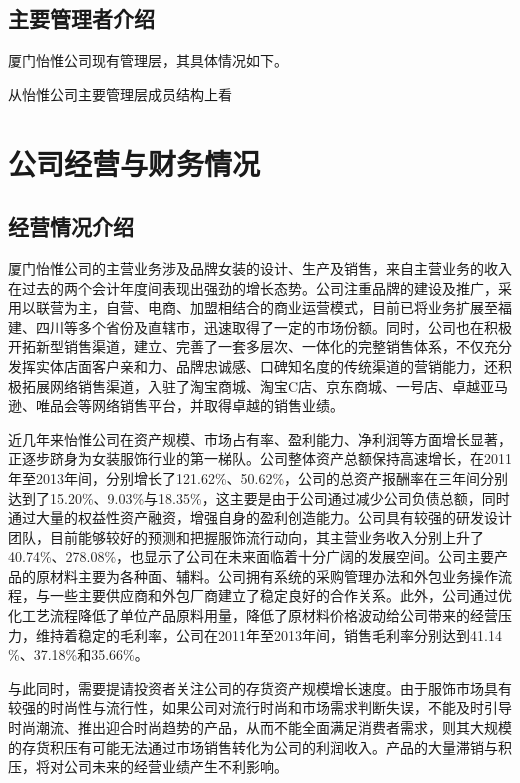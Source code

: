 \subsection{主要管理者介绍}
厦门怡惟公司现有管理层，其具体情况如下。\\
\vspace{1ex}

\begin{mdfbox}[吴雪颖]
\end{mdfbox}

从怡惟公司主要管理层成员结构上看
\section{公司经营与财务情况}
\subsection{经营情况介绍}
厦门怡惟公司的主营业务涉及品牌女装的设计、生产及销售，来自主营业务的收入在过去的两个会计年度间表现出强劲的增长态势。公司注重品牌的建设及推广，采用以联营为主，自营、电商、加盟相结合的商业运营模式，目前已将业务扩展至福建、四川等多个省份及直辖市，迅速取得了一定的市场份额。同时，公司也在积极开拓新型销售渠道，建立、完善了一套多层次、一体化的完整销售体系，不仅充分发挥实体店面客户亲和力、品牌忠诚感、口碑知名度的传统渠道的营销能力，还积极拓展网络销售渠道，入驻了淘宝商城、淘宝C店、京东商城、一号店、卓越亚马逊、唯品会等网络销售平台，并取得卓越的销售业绩。

近几年来怡惟公司在资产规模、市场占有率、盈利能力、净利润等方面增长显著，正逐步跻身为女装服饰行业的第一梯队。公司整体资产总额保持高速增长，在2011年至2013年间，分别增长了121.62\%、50.62\%，公司的总资产报酬率在三年间分别达到了15.20\%、9.03\%与18.35\%，这主要是由于公司通过减少公司负债总额，同时通过大量的权益性资产融资，增强自身的盈利创造能力。公司具有较强的研发设计团队，目前能够较好的预测和把握服饰流行动向，其主营业务收入分别上升了40.74\%、278.08\%，也显示了公司在未来面临着十分广阔的发展空间。公司主要产品的原材料主要为各种面、辅料。公司拥有系统的采购管理办法和外包业务操作流程，与一些主要供应商和外包厂商建立了稳定良好的合作关系。此外，公司通过优化工艺流程降低了单位产品原料用量，降低了原材料价格波动给公司带来的经营压力，维持着稳定的毛利率，公司在2011年至2013年间，销售毛利率分别达到41.14	\%、37.18\%和35.66\%。


与此同时，需要提请投资者关注公司的存货资产规模增长速度。由于服饰市场具有较强的时尚性与流行性，如果公司对流行时尚和市场需求判断失误，不能及时引导时尚潮流、推出迎合时尚趋势的产品，从而不能全面满足消费者需求，则其大规模的存货积压有可能无法通过市场销售转化为公司的利润收入。产品的大量滞销与积压，将对公司未来的经营业绩产生不利影响。


